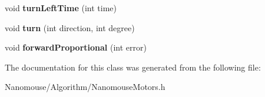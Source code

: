 \begin{DoxyCompactItemize}
\item 
\hypertarget{class_nanomouse_motors_affb93924d17e30b005d1e8910845970f}{}void {\bfseries turn\+Left\+Time} (int time)\label{class_nanomouse_motors_affb93924d17e30b005d1e8910845970f}

\item 
\hypertarget{class_nanomouse_motors_ab92de85e1f8f97c2845af8218534984c}{}void {\bfseries turn} (int direction, int degree)\label{class_nanomouse_motors_ab92de85e1f8f97c2845af8218534984c}

\item 
\hypertarget{class_nanomouse_motors_ab4e9895a192e204505681ca1fbc8a41b}{}void {\bfseries forward\+Proportional} (int error)\label{class_nanomouse_motors_ab4e9895a192e204505681ca1fbc8a41b}

\end{DoxyCompactItemize}


The documentation for this class was generated from the following file\+:\begin{DoxyCompactItemize}
\item 
Nanomouse/\+Algorithm/Nanomouse\+Motors.\+h\end{DoxyCompactItemize}
